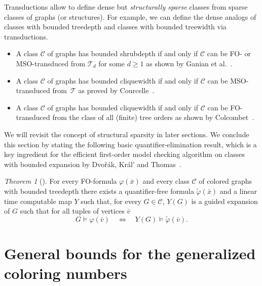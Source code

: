 \documentclass[1p,number,a4paper]{elsarticle}
\theoremstyle{remark}
\newcommand{\Cc}{\mathscr{C}}
\newcommand{\TTT}{\mathscr{T}}
\renewcommand{\phi}{\varphi}
\newtheorem{theorem}{Theorem}[section]
\begin{document}
Transductions allow to define dense but \emph{structurally sparse} classes from sparse classes of graphs (or structures). 
For example, we can define the dense analogs of classes with bounded treedepth and classes with bounded treewidth via transductions. 

\begin{itemize}
    \item A class $\Cc$ of graphs has bounded shrubdepth if and only if $\Cc$ can be FO- or MSO-transduced from $\TTT_d$ for some $d\geq 1$ as shown by Ganian et al.~\cite{ganian2019shrub,ganian2012trees}.
    \item A class $\Cc$ of graphs has bounded cliquewidth if and only if $\Cc$ can be MSO-transduced from~$\TTT$ as proved by Courcelle~\cite{courcelle1992monadic}. 
    \item A class $\Cc$ of graphs has bounded cliquewidth if and only if $\Cc$ can be FO-transduced from the class of all (finite) tree orders as shown by Colcombet~\cite{colcombet2007combinatorial}. 
\end{itemize}

We will revisit the concept of structural sparsity in later sections. 
%
We conclude this section by stating the following basic quantifier-elimination result, which is a key ingredient for the efficient first-order model checking algorithm on classes with bounded expansion by Dvo\v{r}\'ak, Kr\'al' and Thomas~\cite{dvovrak2013testing}. 

\begin{theorem}[\cite{dvovrak2013testing}]\label{thm:qe-trees}
    For every FO-formula $\varphi(\bar x)$ and every class $\Cc$ of colored graphs with bounded treedepth there exists a quantifier-free formula $\tilde\phi(\bar x)$ and a 
    linear time computable map $Y$ such that, for every $G\in\Cc$, $Y(G)$ is a guided expansion of $G$ such that for all tuples of vertices $\bar v$
	\[
	G\models \varphi(\bar v)\quad\iff\quad Y(G)\models\tilde\varphi(\bar v).
	\]
\end{theorem}



\section{General bounds for the generalized coloring numbers}\label{sec:upper-bounds}
\end{document}

